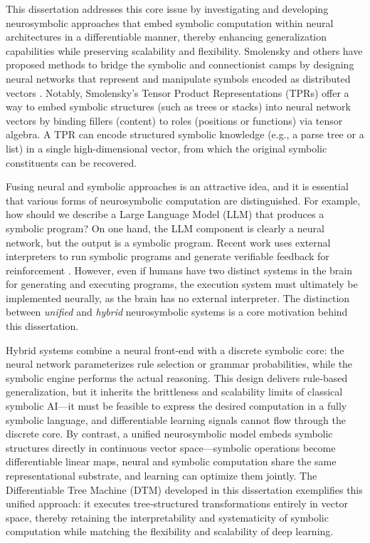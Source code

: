 This dissertation addresses this core issue by investigating and developing neurosymbolic approaches that embed symbolic computation within neural architectures in a differentiable manner, thereby enhancing generalization capabilities while preserving scalability and flexibility. Smolensky and others have proposed methods to bridge the symbolic and connectionist camps by designing neural networks that represent and manipulate symbols encoded as distributed vectors \citep{smolensky_tensor_1990,gayler2003vsa_jackendoff,plate,pollack_recursive_1990}. Notably, Smolensky’s Tensor Product Representations (TPRs) offer a way to embed symbolic structures (such as trees or stacks) into neural network vectors by binding fillers (content) to roles (positions or functions) via tensor algebra. A TPR can encode structured symbolic knowledge (e.g., a parse tree or a list) in a single high-dimensional vector, from which the original symbolic constituents can be recovered.

Fusing neural and symbolic approaches is an attractive idea, and it is essential that various forms of neurosymbolic computation are distinguished. For example, how should we describe a Large Language Model (LLM) that produces a symbolic program? On one hand, the LLM component is clearly a neural network, but the output is a symbolic program. Recent work uses external interpreters to run symbolic programs and generate verifiable feedback for reinforcement \citep{deepseekai2025deepseekr1incentivizingreasoningcapability}. However, even if humans have two distinct systems in the brain for generating and executing programs, the execution system must ultimately be implemented neurally, as the brain has no external interpreter. The distinction between \textit{unified} and \textit{hybrid} neurosymbolic systems is a core motivation behind this dissertation.

Hybrid systems combine a neural front‑end with a discrete symbolic core: the neural network parameterizes rule selection or grammar probabilities, while the symbolic engine performs the actual reasoning. This design delivers rule‑based generalization, but it inherits the brittleness and scalability limits of classical symbolic AI—it must be feasible to express the desired computation in a fully symbolic language, and differentiable learning signals cannot flow through the discrete core. By contrast, a unified neurosymbolic model embeds symbolic structures directly in continuous vector space—symbolic operations become differentiable linear maps, neural and symbolic computation share the same representational substrate, and learning can optimize them jointly. The Differentiable Tree Machine (DTM) developed in this dissertation exemplifies this unified approach: it executes tree‐structured transformations entirely in vector space, thereby retaining the interpretability and systematicity of symbolic computation while matching the flexibility and scalability of deep learning.

